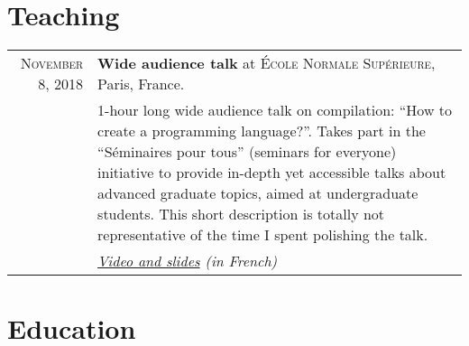 \documentclass[a4paper,10pt]{article} %
\begin{document}
\section{Teaching}

\begin{tabular}{r|p{10.5cm}}

\textsc{November 8, 2018} & \textbf{Wide audience talk} at \textsc{\'Ecole Normale Supérieure}, Paris, France. \\
                          & {1-hour long wide audience talk on compilation: ``How to create a programming language?''. Takes part in the ``Séminaires pour tous'' (seminars for everyone) initiative to provide in-depth yet accessible talks about advanced graduate topics, aimed at undergraduate students. This short description is totally not representative of the time I spent polishing the talk.} \\
                          & \emph{\href{http://seminairespourtous.ens.fr/ipt/1819/exposes/23/comment-creer-un-langage-de-programmation}{Video and slides} (in French)} \\

\end{tabular}



\section{Education}
\end{document}
